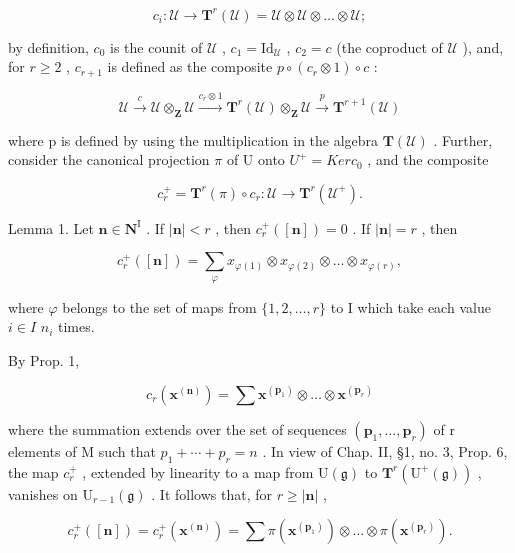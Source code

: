 \[
c _ {i}: \mathcal {U} \rightarrow \mathbf {T} ^ {r} (\mathcal {U}) = \mathcal {U} \otimes \mathcal {U} \otimes \dots \otimes \mathcal {U};
\]

by definition, \(c_0\) is the counit of \(\mathcal{U}\) , \(c_1 = \mathrm{Id}_{\mathcal{U}}\) , \(c_2 = c\) (the coproduct of \(\mathcal{U}\) ), and, for \(r \geq 2\) , \(c_{r+1}\) is defined as the composite \(p \circ (c_r \otimes 1) \circ c\) :

\[
\mathcal {U} \stackrel {{c}} {{\longrightarrow}} \mathcal {U} \otimes_ {\mathbf {Z}} \mathcal {U} \stackrel {{c _ {r} \otimes 1}} {{\longrightarrow}} \mathbf {T} ^ {r} (\mathcal {U}) \otimes_ {\mathbf {Z}} \mathcal {U} \stackrel {{p}} {{\longrightarrow}} \mathbf {T} ^ {r + 1} (\mathcal {U})
\]

where p is defined by using the multiplication in the algebra \(\mathbf{T}(\mathcal{U})\) . Further, consider the canonical projection \(\pi\) of U onto \(U^{+} = Ker c_{0}\) , and the composite

\[
c _ {r} ^ {+} = \mathbf {T} ^ {r} (\pi) \circ c _ {r}: \mathcal {U} \to \mathbf {T} ^ {r} (\mathcal {U} ^ {+}).
\]

Lemma 1. Let \(\mathbf{n} \in \mathbf{N}^{\mathrm{I}}\) . If \(|\mathbf{n}| < r\) , then \(c_{r}^{+}([ \mathbf{n}]) = 0\) . If \(|\mathbf{n}| = r\) , then

\[
c _ {r} ^ {+} ([ \mathbf {n} ]) = \sum_ {\varphi} x _ {\varphi (1)} \otimes x _ {\varphi (2)} \otimes \dots \otimes x _ {\varphi (r)},\tag{7}
\]

where \(\varphi\) belongs to the set of maps from \(\{1,2,\ldots,r\}\) to I which take each value \(i\in I\) \(n_{i}\) times.

By Prop. 1,

\[
c _ {r} \left(\mathbf {x} ^ {(\mathbf {n})}\right) = \sum \mathbf {x} ^ {\left(\mathbf {p} _ {1}\right)} \otimes \dots \otimes \mathbf {x} ^ {\left(\mathbf {p} _ {r}\right)}
\]

where the summation extends over the set of sequences \((\mathbf{p}_{1},\ldots,\mathbf{p}_{r})\) of r elements of M such that \(p_{1}+\cdots+p_{r}=n\) . In view of Chap. II, §1, no. 3, Prop. 6, the map \(c_{r}^{+}\) , extended by linearity to a map from \(\mathrm{U}(\mathfrak{g})\) to \(\mathbf{T}^{r}(\mathrm{U}^{+}(\mathfrak{g}))\) , vanishes on \(\mathrm{U}_{r-1}(\mathfrak{g})\) . It follows that, for \(r\geq|\mathbf{n}|\) ,

\[
c _ {r} ^ {+} ([ \mathbf {n} ]) = c _ {r} ^ {+} (\mathbf {x} ^ {(\mathbf {n})}) = \sum \pi (\mathbf {x} ^ {(\mathbf {p} _ {1})}) \otimes \dots \otimes \pi (\mathbf {x} ^ {(\mathbf {p} _ {r})}).\tag{8}
\]

